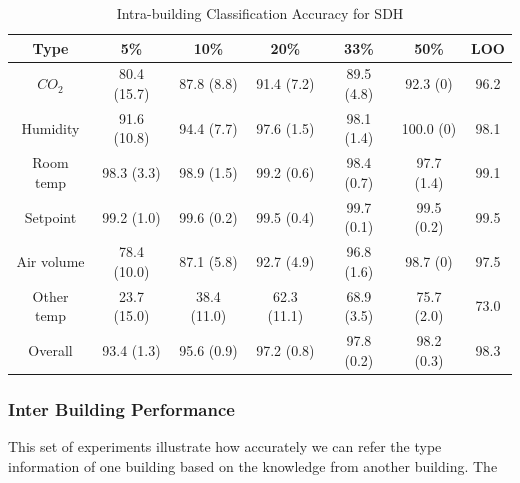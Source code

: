 \begin{table}[ht!]
\caption{Intra-building Classification Accuracy for SDH}
\centering %
\begin{tabular}{c | c | c | c | c | c | c}%
\hline %
Type & 5\% & 10\% & 20\% & 33\% & 50\% & LOO\\ %
\hline\hline %
$CO_{2}$ & 80.4 (15.7) & 87.8 (8.8) & 91.4 (7.2) & 89.5 (4.8) & 92.3 (0) & 96.2\\ \hline
Humidity & 91.6 (10.8) & 94.4 (7.7) & 97.6 (1.5) & 98.1 (1.4) & 100.0 (0) & 98.1\\ \hline
Room temp & 98.3 (3.3) & 98.9 (1.5) & 99.2 (0.6) & 98.4 (0.7) & 97.7 (1.4) & 99.1\\ \hline
Setpoint & 99.2 (1.0) & 99.6 (0.2) & 99.5 (0.4) & 99.7 (0.1) & 99.5 (0.2) & 99.5\\ \hline
Air volume & 78.4 (10.0) & 87.1 (5.8) & 92.7 (4.9) & 96.8 (1.6) & 98.7 (0) & 97.5\\ \hline
Other temp & 23.7 (15.0) & 38.4 (11.0) & 62.3 (11.1) & 68.9 (3.5) & 75.7 (2.0) & 73.0\\ \hline
Overall & 93.4 (1.3) & 95.6 (0.9) & 97.2 (0.8) & 97.8 (0.2) & 98.2 (0.3) & 98.3\\ \hline
\end{tabular}
\label{table:sdh} %
\end{table}

\subsubsection{Inter Building Performance}
This set of experiments illustrate how accurately we can refer the type information of one building based on the knowledge from another building. The 

